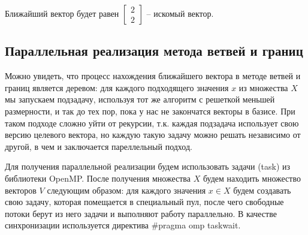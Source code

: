 Ближайший вектор будет равен $ \left[\begin{array}{cccc}
2 \\
2
\end{array}\right] $ -- искомый вектор.

\subsection{Параллельная реализация метода ветвей и границ}

Можно увидеть, что процесс нахождения ближайшего вектора в методе ветвей и границ является деревом: для каждого подходящего значения $ x $ из множества $ X $ мы запускаем подзадачу, используя тот же алгоритм с решеткой меньшей размерности, и так до тех пор, пока у нас не закончатся векторы в базисе. При таком подходе сложно уйти от рекурсии, т.к. каждая подзадача использует свою версию целевого вектора, но каждую такую задачу можно решать независимо от другой, в чем и заключается пареллельный подход.

Для получения параллельной реализации будем использовать задачи (task) из библиотеки OpenMP. После получения множества $ X $ будем находить множество векторов $ V $ следующим образом: для каждого значения $ x \in X $ будем создавать свою задачу, которая помещается в специальный пул, после чего свободные потоки берут из него задачи и выполняют работу параллельно. В качестве синхронизации используется директива \#pragma omp taskwait. %

\clearpage